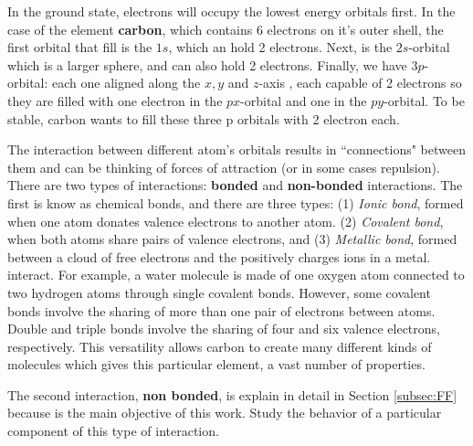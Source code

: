 In the ground state, electrons will occupy the lowest energy orbitals first. In the case of the element \textbf{carbon}, which contains 6 electrons on it's outer shell, the first orbital that fill is the \(1s\), which an hold 2 electrons. Next, is the \(2s\)-orbital which is a larger sphere, and can also hold 2 electrons. Finally, we have \(3p\)-orbital: each one aligned along the \(x,y\) and \(z\)-axis , each capable of 2 electrons so they are filled with one electron in the \(px\)-orbital and one in the \(py\)-orbital. To be stable, carbon wants to fill these three p orbitals with 2 electron each. 

The interaction between different atom's orbitals results in ``connections" between them and can be thinking of forces of attraction (or in some cases repulsion). There are two types of interactions: \textbf{bonded} and \textbf{non-bonded} interactions. The first is know as  chemical bonds, and there are three types: (1) \textit{Ionic bond}, formed when one atom donates valence electrons to another atom. (2) \textit{Covalent bond}, when both atoms share pairs of valence electrons, and (3) \textit{Metallic bond}, formed between a cloud of free electrons and the positively charges ions in a metal. interact. For example, a water molecule is made of one oxygen atom connected to two hydrogen atoms through single covalent bonds.  However, some covalent bonds involve the sharing of more than one pair of electrons between atoms.  Double and triple bonds involve the sharing of four and six valence  electrons,  respectively.   This  versatility  allows  carbon  to  create  many  different kinds of molecules which gives this particular element, a vast number of properties. 

The second interaction, \textbf{non bonded}, is explain in detail in Section \ref{subsec:FF} because is the main objective of this work. Study the behavior of a particular component of this type of interaction. 

